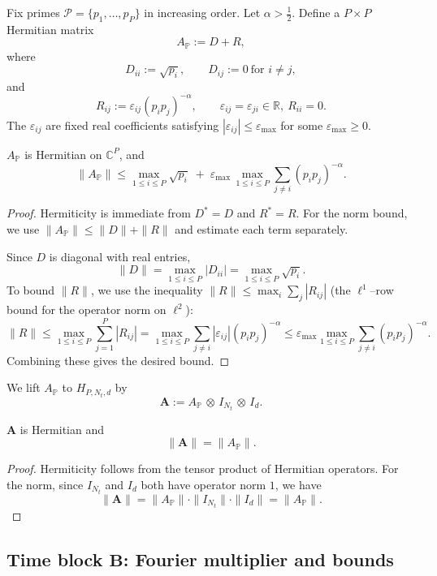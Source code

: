 \documentclass[11pt]{article}
\begin{document}
Fix primes $\mathcal{P} = \{p_1,\dots,p_P\}$ in increasing order.
Let $\alpha > \tfrac12$.
Define a $P\times P$ Hermitian matrix
\[
A_{\mathbb{P}} := D + R,
\]
where
\[
D_{ii} := \sqrt{p_i},\qquad D_{ij} := 0 \ \text{for } i\neq j,
\]
and
\[
R_{ij} := \varepsilon_{ij}(p_i p_j)^{-\alpha},\qquad
\varepsilon_{ij} = \varepsilon_{ji}\in\mathbb{R},\ R_{ii}=0.
\]
The $\varepsilon_{ij}$ are fixed real coefficients satisfying $|\varepsilon_{ij}|\le \varepsilon_{\max}$ for some $\varepsilon_{\max}\ge 0$.

\begin{lemma}
$A_{\mathbb{P}}$ is Hermitian on $\mathbb{C}^P$, and
\[
\|A_{\mathbb{P}}\|
  \le \max_{1\le i\le P} \sqrt{p_i} \;+\;
      \varepsilon_{\max}\,\max_{1\le i\le P} \sum_{j\ne i} (p_i p_j)^{-\alpha}.
\]
\end{lemma}

\begin{proof}
Hermiticity is immediate from $D^*=D$ and $R^*=R$.
For the norm bound, we use $\|A_{\mathbb{P}}\| \le \|D\| + \|R\|$ and estimate each term separately.

Since $D$ is diagonal with real entries,
\[
\|D\| = \max_{1\le i\le P} |D_{ii}| = \max_{1\le i\le P} \sqrt{p_i}.
\]
To bound $\|R\|$, we use the inequality $\|R\| \le \max_i \sum_j |R_{ij}|$ (the $\ell^1$--row bound for the operator norm on $\ell^2$):
\[
\|R\|
  \le \max_{1\le i\le P} \sum_{j=1}^P |R_{ij}|
  =  \max_{1\le i\le P} \sum_{j\ne i} |\varepsilon_{ij}| (p_i p_j)^{-\alpha}
  \le \varepsilon_{\max} \max_{1\le i\le P} \sum_{j\ne i} (p_i p_j)^{-\alpha}.
\]
Combining these gives the desired bound.
\end{proof}

We lift $A_{\mathbb{P}}$ to $H_{P,N_t,d}$ by
\[
\mathbf{A} := A_{\mathbb{P}} \,\otimes\, I_{N_t} \,\otimes\, I_d.
\]

\begin{corollary}
$\mathbf{A}$ is Hermitian and
\[
\|\mathbf{A}\| = \|A_{\mathbb{P}}\|.
\]
\end{corollary}

\begin{proof}
Hermiticity follows from the tensor product of Hermitian operators.
For the norm, since $I_{N_t}$ and $I_d$ both have operator norm $1$, we have
\[
\|\mathbf{A}\| = \|A_{\mathbb{P}}\|\cdot \|I_{N_t}\|\cdot\|I_d\|
               = \|A_{\mathbb{P}}\|.
\]
\end{proof}

\subsection{Time block \texorpdfstring{$\mathbf{B}$}{B}: Fourier multiplier and bounds}
\end{document}
